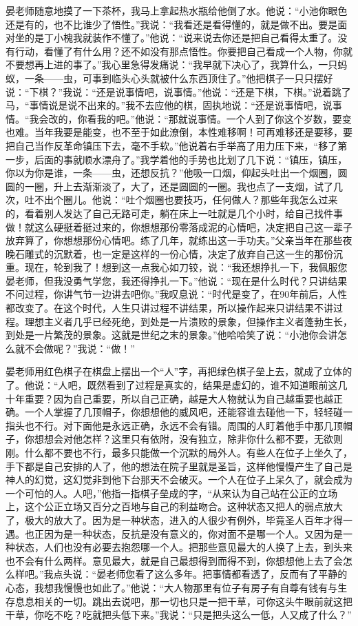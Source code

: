 \documentclass[12pt,oneside]{book}
\begin{document}
晏老师随意地摸了一下茶杯，我马上拿起热水瓶给他倒了水。他说：``小池你眼色还是有的，也不比谁少了悟性。''我说：``我看还是看得懂的，就是做不出。要是面对坐的是丁小槐我就装作不懂了。''他说：``说来说去你还是把自己看得太重了。没有行动，看懂了有什么用？还不如没有那点悟性。你要把自己看成一个人物，你就不要想再上进的事了。''我心里急得发痛说：``我早就下决心了，我算什么，一只蚂蚁，一条------虫，可事到临头心头就被什么东西顶住了。''他把棋子一只只摆好说：``下棋？''我说：``还是说事情吧，说事情。''他说：``还是下棋，下棋。''说着跳了马，``事情说是说不出来的。''我不去应他的棋，固执地说：``还是说事情吧，说事情。``我会改的，你看我的吧。''他说：``那就说事情。一个人到了你这个岁数，要变也难。当年我要是能变，也不至于如此潦倒，本性难移啊！可再难移还是要移，要把自己当作反革命镇压下去，毫不手软。''他说着右手举高了用力压下来，``移了第一步，后面的事就顺水漂舟了。''我学着他的手势也比划了几下说：``镇压，镇压，你以为你是谁，一条------虫，还想反抗？''他吸一口烟，仰起头吐出一个烟圈，圆圆的一圈，升上去渐渐淡了，大了，还是圆圆的一圈。我也点了一支烟，试了几次，吐不出个圈儿。他说：``吐个烟圈也要技巧，任何做人？那些年我怎么过来的，看着别人发达了自己无路可走，躺在床上一吐就是几个小时，给自己找件事做！就这么硬挺着挺过来的，你想想那份零落成泥的心情吧，决定把自己这一辈子放弃算了，你想想那份心情吧。练了几年，就练出这一手功夫。''父亲当年在那些夜晚石雕式的沉默着，也一定是这样的一份心情，决定了放弃自己这一生的那份沉重。现在，轮到我了！想到这一点我心如刀铰，说：``我还想挣扎一下，我佩服您晏老师，但我没勇气学您，我还得挣扎一下。''他说：``现在是什么时代？只讲结果不问过程，你讲气节一边讲去吧你。''我叹息说：``时代是变了，在90年前后，人性都改变了。在这个时代，人生只讲过程不讲结果，所以操作起来只讲结果不讲过程。理想主义者几乎已经死绝，到处是一片溃败的景象，但操作主义者蓬勃生长，到处是一片繁茂的景象。这就是世纪之末的景象。''他哈哈笑了说：``小池你会讲怎么就不会做呢？''我说：``做！''

晏老师用红色棋子在棋盘上摆出一个``人''字，再把绿色棋子垒上去，就成了立体的了。他说：``人吧，既然看到了过程是真实的，结果是虚幻的，谁不知道眼前这几十年重要？因为自己重要，所以自己正确，越是大人物就认为自己越重要也越正确。一个人掌握了几顶帽子，你想想他的威风吧，还能容谁去碰他一下，轻轻碰一指头也不行。对下面他是永远正确，永远不会有错。周围的人盯着他手中那几顶帽子，你想想会对他怎样？这里只有依附，没有独立，除非你什么都不要，无欲则刚。什么都不要也不行，最多只能做一个沉默的局外人。有些人在位子上坐久了，手下都是自己安排的人了，他的想法在院子里就是圣旨，这样他慢慢产生了自己是神人的幻觉，这幻觉非到他下台那天不会破灭。一个人在位子上呆久了，就会成为一个可怕的人。人吧，''他指一指棋子垒成的字，``从来认为自己站在公正的立场上，这个公正立场又百分之百地与自己的利益吻合。这种状态又把人的弱点放大了，极大的放大了。因为是一种状态，进入的人很少有例外，毕竟圣人百年才得一遇。也正因为是一种状态，反抗是没有意义的，你对面不是哪一个人。又因为是一种状态，人们也没有必要去抱怨哪一个人。把那些意见最大的人换了上去，到头来也不会有什么两样。意见最大，就是自己最想得到而得不到，你想想他上去了会怎么样吧。''我点头说：``晏老师您看了这么多年。把事情都看透了，反而有了平静的心态，我想我慢慢也如此了。''他说：``大人物那里有位子有房子有自尊有钱有与生存息息相关的一切。跳出去说吧，那一切也只是一把干草，可你这头牛眼前就这把干草，你吃不吃？吃就把头低下来。''我说：``只是把头这么一低，人又成了什么？''
\end{document}
